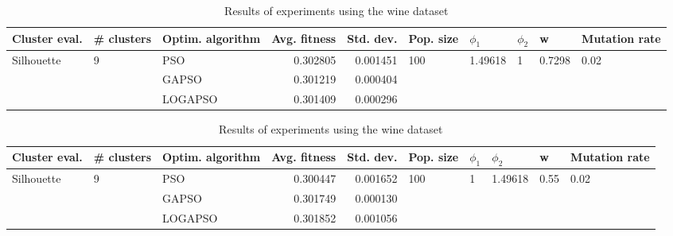 \documentclass{article}
\begin{document}
\begin{table}
\centering
\caption{Results of experiments using the wine dataset}
\begin{tabular}{lllrrlllll}
\toprule
              Cluster eval. &        \# clusters & Optim. algorithm &  Avg. fitness &  Std. dev. &            Pop. size &               $\phi_{1}$ &         $\phi_{2}$ &                       w &         Mutation rate \\
\midrule
\multirow{3}{*}{Silhouette} & \multirow{3}{*}{9} &              PSO &      0.302805 &   0.001451 & \multirow{3}{*}{100} & \multirow{3}{*}{1.49618} & \multirow{3}{*}{1} & \multirow{3}{*}{0.7298} & \multirow{3}{*}{0.02} \\
                            &                    &            GAPSO &      0.301219 &   0.000404 &                      &                          &                    &                         &                       \\
                            &                    &          LOGAPSO &      0.301409 &   0.000296 &                      &                          &                    &                         &                       \\
\bottomrule
\end{tabular}
\end{table}
\begin{table}
\centering
\caption{Results of experiments using the wine dataset}
\begin{tabular}{lllrrlllll}
\toprule
              Cluster eval. &        \# clusters & Optim. algorithm &  Avg. fitness &  Std. dev. &            Pop. size &         $\phi_{1}$ &               $\phi_{2}$ &                     w &         Mutation rate \\
\midrule
\multirow{3}{*}{Silhouette} & \multirow{3}{*}{9} &              PSO &      0.300447 &   0.001652 & \multirow{3}{*}{100} & \multirow{3}{*}{1} & \multirow{3}{*}{1.49618} & \multirow{3}{*}{0.55} & \multirow{3}{*}{0.02} \\
                            &                    &            GAPSO &      0.301749 &   0.000130 &                      &                    &                          &                       &                       \\
                            &                    &          LOGAPSO &      0.301852 &   0.001056 &                      &                    &                          &                       &                       \\
\bottomrule
\end{tabular}
\end{table}
\end{document}
